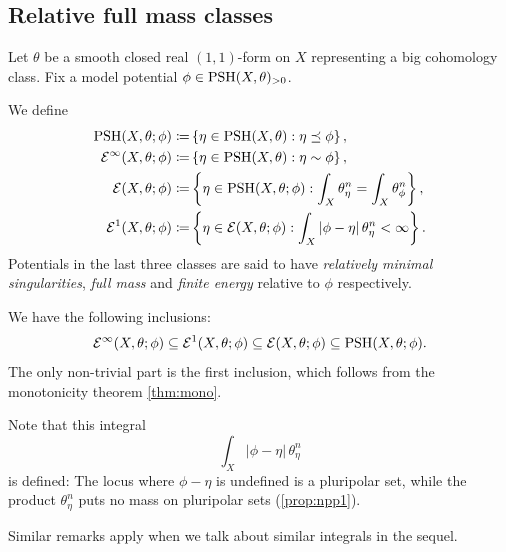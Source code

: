 \subsection{Relative full mass classes}\label{subsec:fullmass}
Let $\theta$ be a smooth closed real $(1,1)$-form on $X$ representing a big cohomology class. Fix a model potential $\phi\in \mathrm{PSH}(X,\theta)_{>0}$.



\begin{definition}\label{def:envelopes:L906}
    We define
    \[
        \begin{aligned}
        \mathrm{PSH}(X,\theta;\phi)\coloneqq &\left\{\eta\in \mathrm{PSH}(X,\theta): \eta\preceq \phi\right\},\\
        \mathcal{E}^{\infty}(X,\theta;\phi)\coloneqq &\left\{\eta\in \mathrm{PSH}(X,\theta): \eta\sim \phi\right\},\\
        \mathcal{E}(X,\theta;\phi)\coloneqq &\left\{\eta\in \mathrm{PSH}(X,\theta;\phi): \int_X \theta_{\eta}^n=\int_X \theta_{\phi}^n\right\},\\
        \mathcal{E}^1(X,\theta;\phi)\coloneqq &\left\{\eta\in \mathcal{E}(X,\theta;\phi): \int_X |\phi-\eta|\,\theta_{\eta}^n<\infty\right\}.
        \end{aligned}
    \]
     
    Potentials in the last three classes are said to have \emph{relatively minimal singularities}, \emph{full mass} and \emph{finite energy} relative to $\phi$ respectively.
\end{definition}
We have the following inclusions:
\begin{equation}\label{eq:energyclassinc}
\mathcal{E}^{\infty}(X,\theta;\phi)\subseteq \mathcal{E}^1(X,\theta;\phi)\subseteq \mathcal{E}(X,\theta;\phi)\subseteq \mathrm{PSH}(X,\theta;\phi).
\end{equation}
The only non-trivial part is the first inclusion, which follows from the monotonicity theorem \cref{thm:mono}.

\begin{remark}\label{rmk:intwelldef}
    Note that this integral
    \[
    \int_X |\phi-\eta|\,\theta_{\eta}^n
    \]
    is defined: The locus where $\phi-\eta$ is undefined is a pluripolar set, while the product $\theta_{\eta}^n$ puts no mass on pluripolar sets (\cref{prop:npp1}).

    Similar remarks apply when we talk about similar integrals in the sequel.
\end{remark}


